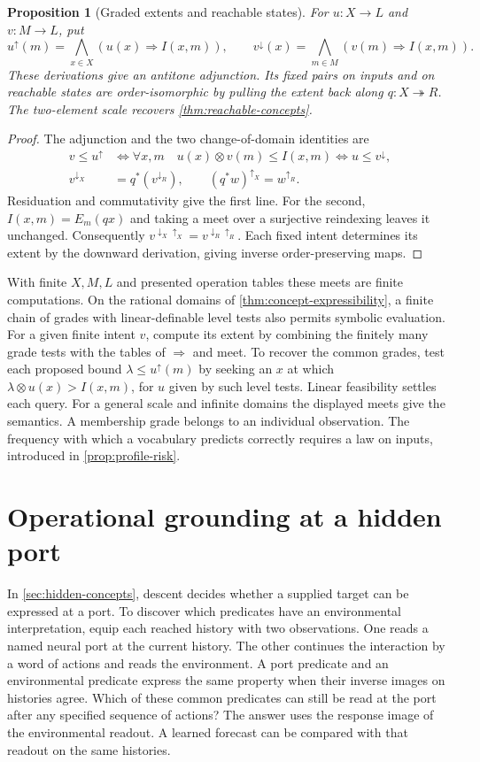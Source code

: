 \documentclass[11pt,a4paper]{article}
\newtheorem{proposition}[proposition]{Proposition}
\theoremstyle{definition}
\theoremstyle{remark}\newaliascnt{remark}{theorem}
\newcommand{\onto}{\twoheadrightarrow}
\numberwithin{equation}{section}
\begin{document}
\begin{proposition}[Graded extents and reachable states]\label{prop:graded-port}
For $u:X\to L$ and $v:M\to L$, put
\[
 u^\uparrow(m)=\bigwedge_{x\in X}(u(x)\Rightarrow I(x,m)),\qquad
 v^\downarrow(x)=\bigwedge_{m\in M}(v(m)\Rightarrow I(x,m)).
\]
These derivations give an antitone adjunction. Its fixed pairs on inputs and on reachable states are order-isomorphic by pulling the extent back along $q:X\onto R$. The two-element scale recovers \cref{thm:reachable-concepts}.
\end{proposition}
\begin{proof}
The adjunction and the two change-of-domain identities are
\[
\begin{aligned}
 v\le u^\uparrow
  &\iff \forall x,m\quad u(x)\otimes v(m)\le I(x,m)
   \iff u\le v^\downarrow,\\
 v^{\downarrow_X}&=q^*(v^{\downarrow_R}),\qquad
 (q^*w)^{\uparrow_X}=w^{\uparrow_R}.
\end{aligned}
\]
Residuation and commutativity give the first line. For the second, \(I(x,m)=E_m(qx)\) and taking a meet over a surjective reindexing leaves it unchanged. Consequently \(v^{\downarrow_X\uparrow_X}=v^{\downarrow_R\uparrow_R}\). Each fixed intent determines its extent by the downward derivation, giving inverse order-preserving maps.
\end{proof}
With finite $X,M,L$ and presented operation tables these meets are finite computations. On the rational domains of \cref{thm:concept-expressibility}, a finite chain of grades with linear-definable level tests also permits symbolic evaluation. For a given finite intent $v$, compute its extent by combining the finitely many grade tests with the tables of $\Rightarrow$ and meet. To recover the common grades, test each proposed bound $\lambda\le u^\uparrow(m)$ by seeking an $x$ at which $\lambda\otimes u(x)>I(x,m)$, for $u$ given by such level tests. Linear feasibility settles each query. For a general scale and infinite domains the displayed meets give the semantics. A membership grade belongs to an individual observation. The frequency with which a vocabulary predicts correctly requires a law on inputs, introduced in \cref{prop:profile-risk}.

\section{Operational grounding at a hidden port}\label{sec:ground-operational}

In \cref{sec:hidden-concepts}, descent decides whether a supplied target can be expressed at a port. To discover which predicates have an environmental interpretation, equip each reached history with two observations. One reads a named neural port at the current history. The other continues the interaction by a word of actions and reads the environment. A port predicate and an environmental predicate express the same property when their inverse images on histories agree. Which of these common predicates can still be read at the port after any specified sequence of actions? The answer uses the response image of the environmental readout. A learned forecast can be compared with that readout on the same histories.
\end{document}

